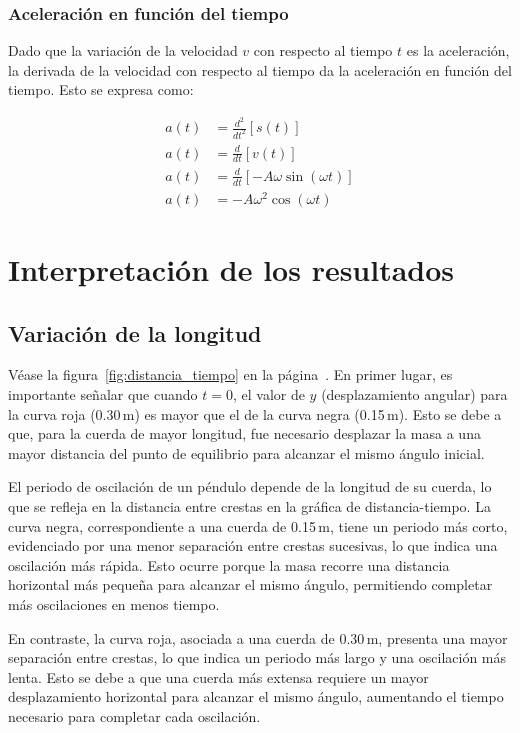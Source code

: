 \documentclass[letterpaper]{report}
\numberwithin{table}{section}
\begin{document}
\subsubsection{Aceleración en función del tiempo}

Dado que la variación de la velocidad $v$ con respecto al tiempo $t$
es la aceleración, la derivada de la velocidad con respecto al tiempo
da la aceleración en función del tiempo. Esto se expresa como:

\begin{align}
  a(t) &= \frac{d^{2}}{dt^{2}} \left[s(t)\right] \nonumber \\
  a(t) &= \frac{d}{dt} \left[v(t)\right] \nonumber \\
  a(t) &= \frac{d}{dt} \left[-A\omega\sin{(\omega t)}\right] \nonumber \\
  a(t) &= -A\omega^{2}\cos{(\omega t)}\label{eq:aceleración_tiempo}
\end{align}

\section{Interpretación de los resultados}

\subsection{Variación de la longitud}

Véase la figura~\ref{fig:distancia_tiempo} en la
página~\pageref{fig:distancia_tiempo}. En primer lugar, es
importante señalar que cuando $t=0$, el valor de $y$
(desplazamiento angular) para la curva roja (0.30\,m) es mayor que el de
la curva negra (0.15\,m). Esto se debe a que, para la cuerda de mayor
longitud, fue necesario desplazar la masa a una mayor distancia del
punto de equilibrio para alcanzar el mismo ángulo inicial.

El periodo de oscilación de un péndulo depende de la longitud de su
cuerda, lo que se refleja en la distancia entre crestas en la gráfica
de distancia-tiempo. La curva negra, correspondiente a una cuerda de
0.15\,m, tiene un periodo más corto, evidenciado por una menor
separación entre crestas sucesivas, lo que indica una oscilación más
rápida. Esto ocurre porque la masa recorre una distancia horizontal
más pequeña para alcanzar el mismo ángulo, permitiendo completar más
oscilaciones en menos tiempo.

En contraste, la curva roja, asociada a una cuerda de 0.30\,m, presenta
una mayor separación entre crestas, lo que indica un periodo más
largo y una oscilación más lenta. Esto se debe a que una cuerda más
extensa requiere un mayor desplazamiento horizontal para alcanzar el
mismo ángulo, aumentando el tiempo necesario para completar cada oscilación.
\end{document}
